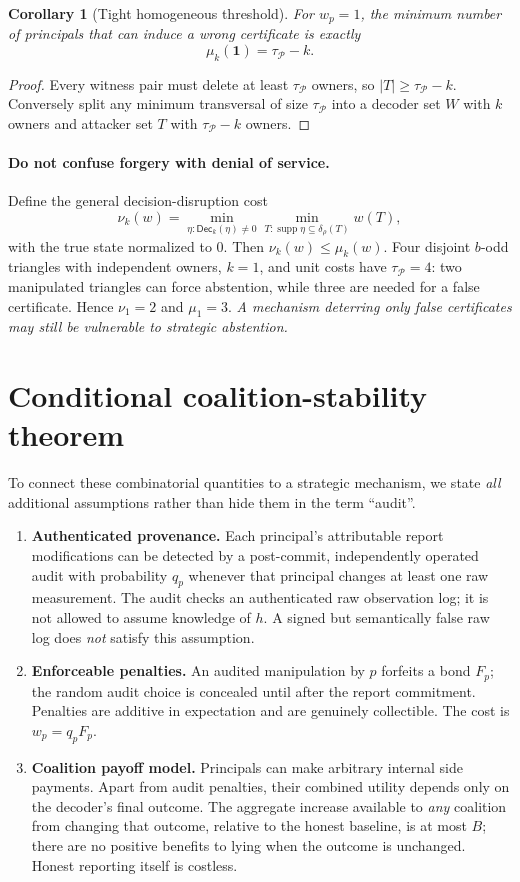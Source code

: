 \documentclass[10pt,a4paper]{article}
\newtheorem{corollary}[theorem]{Corollary}
\newcommand{\Pc}{\mathcal P}
\newcommand{\supp}{\operatorname{supp}}
\newcommand{\Dec}{\mathsf{Dec}}
\newcommand{\deltaP}{\delta_\rho}
\begin{document}
\begin{corollary}[Tight homogeneous threshold]\label{cor:hom}
For $w_p=1$, the minimum number of principals that can induce a wrong certificate is exactly
\[\boxed{\mu_k(\mathbf1)=\tau_\Pc-k.}\]
\end{corollary}
\begin{proof}Every witness pair must delete at least $\tau_\Pc$ owners, so $|T|\ge\tau_\Pc-k$. Conversely split any minimum transversal of size $\tau_\Pc$ into a decoder set $W$ with $k$ owners and attacker set $T$ with $\tau_\Pc-k$ owners.\end{proof}

\paragraph{Do not confuse forgery with denial of service.} Define the general decision-disruption cost
\begin{equation}\label{eq:nu}
 \nu_k(w)=\min_{\eta:\Dec_k(\eta)\ne0}\min_{T:\supp\eta\subseteq\deltaP(T)}w(T),
\end{equation}
with the true state normalized to $0$. Then $\nu_k(w)\le\mu_k(w)$. Four disjoint $b$-odd triangles with independent owners, $k=1$, and unit costs have $\tau_\Pc=4$: two manipulated triangles can force abstention, while three are needed for a false certificate. Hence $\nu_1=2$ and $\mu_1=3$. \emph{A mechanism deterring only false certificates may still be vulnerable to strategic abstention.}

\section{Conditional coalition-stability theorem}
To connect these combinatorial quantities to a strategic mechanism, we state \emph{all} additional assumptions rather than hide them in the term ``audit''.
\begin{enumerate}
\item \textbf{Authenticated provenance.} Each principal's attributable report modifications can be detected by a post-commit, independently operated audit with probability $q_p$ whenever that principal changes at least one raw measurement. The audit checks an authenticated raw observation log; it is not allowed to assume knowledge of $h$. A signed but semantically false raw log does \emph{not} satisfy this assumption.
\item \textbf{Enforceable penalties.} An audited manipulation by $p$ forfeits a bond $F_p$; the random audit choice is concealed until after the report commitment. Penalties are additive in expectation and are genuinely collectible. The cost is $w_p=q_pF_p$.
\item \textbf{Coalition payoff model.} Principals can make arbitrary internal side payments. Apart from audit penalties, their combined utility depends only on the decoder's final outcome. The aggregate increase available to \emph{any} coalition from changing that outcome, relative to the honest baseline, is at most $B$; there are no positive benefits to lying when the outcome is unchanged. Honest reporting itself is costless.
\end{enumerate}
\end{document}

